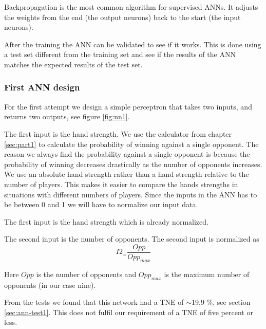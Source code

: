 Backpropagation is the most common algorithm for supervised ANNs. It adjusts the weights from the end (the output neurons) back to the start (the input neurons).

After the training the ANN can be validated to see if it works. This is done using a test set different from the training set and see if the results of the ANN matches the expected results of the test set.

\subsubsection{First ANN design}
\label{sec:design1}
For the first attempt we design a simple perceptron that takes two inputs, and returns two outputs, see figure \ref{fig:nn1}. 


The first input is the hand strength. We use the calculator from chapter \ref{sec:part1} to calculate the probability of winning against a single opponent. The reason we always find the probability against a single opponent is because the probability of winning decreases drastically as the number of opponents increases. We use an absolute hand strength rather than a hand strength relative to the number of players.
This makes it easier to compare the hands strengths in situations with different numbers of players. 
Since the inputs in the ANN has to be between 0 and 1 we will have to normalize our input data.

The first input is the hand strength which is already normalized. 

The second input is the number of opponents. The second input is normalized as \[I2_ = \frac{Opp}{Opp_{max}}\] 

Here $Opp$ is the number of opponents and $Opp_{max}$ is the maximum number of opponents (in our case nine).

From the tests we found that this network had a TNE of $\sim$19,9 \%, see section \ref{sec:ann-test1}. This does not fulfil our requirement of a TNE of five percent or less.

